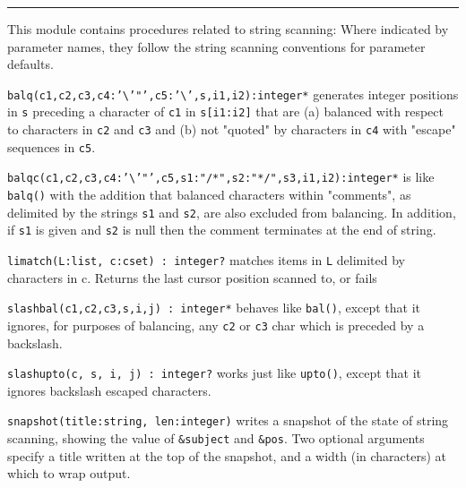 \vspace{0.25cm}\hrule{}

This module contains procedures related to string
scanning: Where indicated by parameter names, they follow the string
scanning conventions for parameter defaults.

\texttt{balq(c1,c2,c3,c4:'{\textbackslash}'"',c5:'{\textbackslash}',s,i1,i2):integer*}
generates integer positions in \texttt{s} preceding a character of
\texttt{c1} in \texttt{s[i1:i2]} that are (a) balanced with respect to
characters in \texttt{c2} and \texttt{c3} and (b) not
"quoted" by characters in \texttt{c4} with
"escape" sequences in
\texttt{c5}.

\texttt{balqc(c1,c2,c3,c4:'{\textbackslash}'"',c5,s1:"/*",s2:"*/",s3,i1,i2):integer*}
is like \texttt{balq()} with the addition that balanced characters
within "comments", as delimited by the
strings \texttt{s1} and \texttt{s2}, are also excluded from balancing.
In addition, if \texttt{s1} is given and \texttt{s2} is null then the
comment terminates at the end of string.

\texttt{limatch(L:list, c:cset) : integer?} matches items in \texttt{L} delimited
by characters in c. Returns the last cursor position scanned to, or
fails 

\texttt{slashbal(c1,c2,c3,s,i,j) : integer*} behaves like
\texttt{bal()}, except that it ignores, for purposes of balancing, any
\texttt{c2} or \texttt{c3} char which is preceded by a backslash.

\texttt{slashupto(c, s, i, j) : integer?} works just like
\texttt{upto()}, except that it ignores backslash escaped characters.

\texttt{snapshot(title:string, len:integer)} writes a snapshot of the
state of string scanning, showing the value of \texttt{\&subject} and
\texttt{\&pos}. Two optional arguments specify a title written at the
top of the snapshot, and a width (in characters) at which to wrap
output. %




